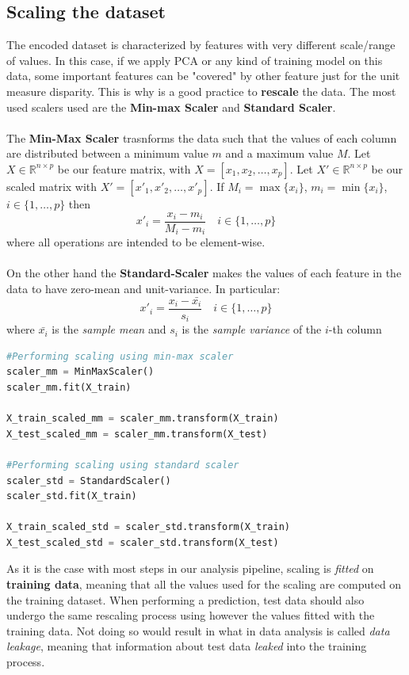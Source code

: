\subsection{Scaling the dataset}

The encoded dataset is characterized by features with very different scale/range  of values. In this case, if we apply PCA or any kind of training model on this data, some important features can be "covered" by other feature just for the unit measure disparity. This is why is a good practice to \textbf{rescale} the data. The most used scalers used are the \textbf{Min-max Scaler} and \textbf{Standard Scaler}.\\
\\
The \textbf{Min-Max Scaler} trasnforms the data such that the values of each column are distributed between a minimum value $m$ and a maximum value $M$. Let $X \in \mathbb{R}^{n \times p}$ be our feature matrix, with $X=[x_1, x_2, \dots, x_p]$. Let $X' \in \mathbb{R}^{n \times p}$ be our scaled matrix with $X'=[x'_1, x'_2, \dots, x'_p]$. If $M_i = \max\{x_i\}$, $m_i = \min\{x_i\}$, $i \in \{1,  \dots,  p\}$ then
\begin{equation}
    x'_i = \frac{x_i - m_i}{M_i-m_i} \quad i \in \{1,  \dots,  p\}    
\end{equation}
where all operations are intended to be element-wise. \\
\\
On the other hand the \textbf{Standard-Scaler} makes the values of each feature in the data to have zero-mean and unit-variance. In particular: 
\begin{equation}
    x'_i = \frac{x_i - \bar{x_i}}{s_i} \quad i \in \{1,  \dots,  p\}    
\end{equation}
where $\bar{x_i}$ is the \textit{sample mean} and $s_i$ is the \textit{sample variance} of the $i$-th column
\begin{lstlisting}[language=Python, caption= Data scaling]
#Performing scaling using min-max scaler
scaler_mm = MinMaxScaler()
scaler_mm.fit(X_train)

X_train_scaled_mm = scaler_mm.transform(X_train)
X_test_scaled_mm = scaler_mm.transform(X_test)

#Performing scaling using standard scaler
scaler_std = StandardScaler()
scaler_std.fit(X_train)

X_train_scaled_std = scaler_std.transform(X_train)
X_test_scaled_std = scaler_std.transform(X_test)
\end{lstlisting}
As it is the case with most steps in our analysis pipeline, scaling is \textit{fitted} on \textbf{training data}, meaning that all the values used for the scaling are computed on the training dataset. When performing a prediction, test data should also undergo the same rescaling process using however the values fitted with the training data. Not doing so would result in what in data analysis is called \textit{data leakage}, meaning that information about test data \textit{leaked} into the training process.

